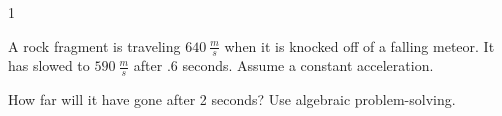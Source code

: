 
\AddToShipoutPicture*{\BackgroundPic}

\addtocounter {ProbNum} {1}

 
{\bf \Large{}} A rock fragment is traveling ${640~\tfrac{m}{s}}$  when it is knocked off of a falling meteor. It has slowed to ${590~\tfrac{m}{s}}$  after .6 seconds.  Assume a constant acceleration. 

\bigskip
How far will it have gone after 2 seconds? Use algebraic problem-solving.



\vfill
\newpage
